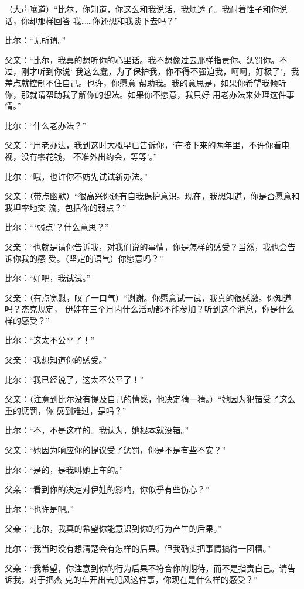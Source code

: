 \documentclass{ctexart}
\renewenvironment{quotation}{\setlength{\parskip}{0.5em}\setstretch{1.5}\kaishu\zihao{-5}\setlength{\parindent}{1em}}{\vspace{1em}}
\begin{document}
\begin{quotation}
	（大声嚷道）``比尔，你知道，你这么和我说话，我烦透了。我耐着性子和你说话，你却那样回答
	我\ldots\ldots 你还想和我谈下去吗？''

	比尔：``无所谓。''

	父亲：``比尔，我真的想听你的心里话。我不想像过去那样指责你、惩罚你。不过，刚才听到你说`
	我这么蠢，为了保护我，你不得不强迫我，呵呵，好极了'，我差点就控制不住自己。也许，你愿意
	帮助我。我的意思是，如果你希望我倾听你，那就请帮助我了解你的想法。如果你不愿意，我只好
	用老办法来处理这件事情。''

	比尔：``什么老办法？''

	父亲：``用老办法，我到这时大概早已告诉你，`在接下来的两年里，不许你看电视，没有零花钱，
	不准外出约会，等等'。''

	比尔：``哦，也许你不妨先试试新办法。''

	父亲：（带点幽默）``很高兴你还有自我保护意识。现在，我想知道，你是否愿意和我坦率地交
	流，包括你的弱点？''

	比尔：``\,`弱点'？什么意思？''

	父亲：``也就是请你告诉我，对我们说的事情，你是怎样的感受？当然，我也会告诉你我的感
	受。（坚定的语气）你愿意吗？''

	比尔：``好吧，我试试。''

	父亲：（有点宽慰，叹了一口气）``谢谢。你愿意试一试，我真的很感激。你知道吗？杰克规定，
	伊娃在三个月内什么活动都不能参加？听到这个消息，你是什么样的感受？''

	比尔：``这太不公平了！''

	父亲：``我想知道你的感受。''

	比尔：``我已经说了，这太不公平了！''

	父亲：（注意到比尔没有提及自己的情感，他决定猜一猜。）``她因为犯错受了这么重的惩罚，你
	感到难过，是吗？''

	比尔：``不，不是这样的。我认为，她根本就没错。''

	父亲：``她因为响应你的提议受了惩罚，你是不是有些不安？''

	比尔：``是的，是我叫她上车的。''

	父亲：``看到你的决定对伊娃的影响，你似乎有些伤心？''

	比尔：``也许是吧。''

	父亲：``比尔，我真的希望你能意识到你的行为产生的后果。''

	比尔：``我当时没有想清楚会有怎样的后果。但我确实把事情搞得一团糟。''

	父亲：``我希望，你注意到你的行为后果不符合你的期待，而不是指责自己。请告诉我，对于把杰
	克的车开出去兜风这件事，你现在是什么样的感受？''


\end{quotation}
\end{document}
